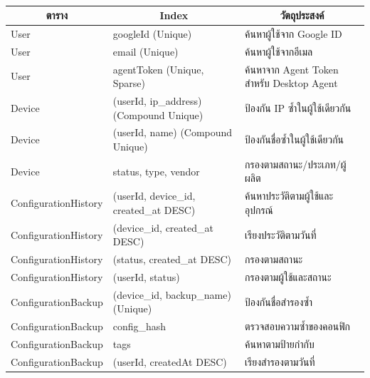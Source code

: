 \begin{table}[H]
    \caption{}
    \label{tab:database-indexes}
    \fontSixTeen 
    \begin{tabularx}{\textwidth}{|l|l|X|} 
        \hline
        \multicolumn{1}{|c|}{\textbf{ตาราง}} & \multicolumn{1}{c|}{\textbf{Index}} & \multicolumn{1}{c|}{\textbf{วัตถุประสงค์}} \\
        \hline
        User & googleId (Unique) & ค้นหาผู้ใช้จาก Google ID \\
        \hline
        User & email (Unique) & ค้นหาผู้ใช้จากอีเมล \\
        \hline
        User & agentToken (Unique, Sparse) & ค้นหาจาก Agent Token สำหรับ Desktop Agent \\
        \hline
        Device & (userId, ip\_address) (Compound Unique) & ป้องกัน IP ซ้ำในผู้ใช้เดียวกัน \\
        \hline
        Device & (userId, name) (Compound Unique) & ป้องกันชื่อซ้ำในผู้ใช้เดียวกัน \\
        \hline
        Device & status, type, vendor & กรองตามสถานะ/ประเภท/ผู้ผลิต \\
        \hline
        ConfigurationHistory & (userId, device\_id, created\_at DESC) & ค้นหาประวัติตามผู้ใช้และอุปกรณ์ \\
        \hline
        ConfigurationHistory & (device\_id, created\_at DESC) & เรียงประวัติตามวันที่ \\
        \hline
        ConfigurationHistory & (status, created\_at DESC) & กรองตามสถานะ \\
        \hline
        ConfigurationHistory & (userId, status) & กรองตามผู้ใช้และสถานะ \\
        \hline
        ConfigurationBackup & (device\_id, backup\_name) (Unique) & ป้องกันชื่อสำรองซ้ำ \\
        \hline
        ConfigurationBackup & config\_hash & ตรวจสอบความซ้ำของคอนฟิก \\
        \hline
        ConfigurationBackup & tags & ค้นหาตามป้ายกำกับ \\
        \hline
        ConfigurationBackup & (userId, createdAt DESC) & เรียงสำรองตามวันที่ \\
        \hline
    \end{tabularx}
\end{table}

